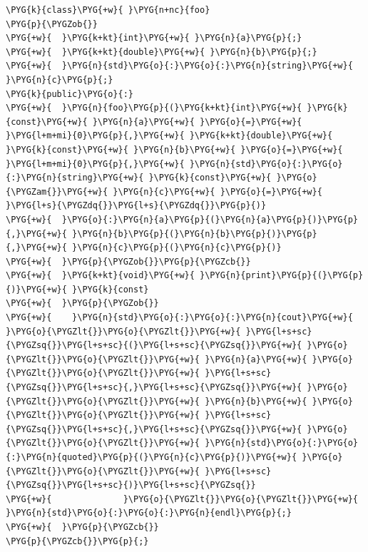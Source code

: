 \begin{codeblockbg}
\begin{Verbatim}[commandchars=\\\{\},breaklines=true,breakanywhere=true,fontsize=\codefont,xleftmargin=17bp]
\PYG{k}{class}\PYG{+w}{ }\PYG{n+nc}{foo}
\PYG{p}{\PYGZob{}}
\PYG{+w}{  }\PYG{k+kt}{int}\PYG{+w}{ }\PYG{n}{a}\PYG{p}{;}
\PYG{+w}{  }\PYG{k+kt}{double}\PYG{+w}{ }\PYG{n}{b}\PYG{p}{;}
\PYG{+w}{  }\PYG{n}{std}\PYG{o}{:}\PYG{o}{:}\PYG{n}{string}\PYG{+w}{ }\PYG{n}{c}\PYG{p}{;}
\PYG{k}{public}\PYG{o}{:}
\PYG{+w}{  }\PYG{n}{foo}\PYG{p}{(}\PYG{k+kt}{int}\PYG{+w}{ }\PYG{k}{const}\PYG{+w}{ }\PYG{n}{a}\PYG{+w}{ }\PYG{o}{=}\PYG{+w}{ }\PYG{l+m+mi}{0}\PYG{p}{,}\PYG{+w}{ }\PYG{k+kt}{double}\PYG{+w}{ }\PYG{k}{const}\PYG{+w}{ }\PYG{n}{b}\PYG{+w}{ }\PYG{o}{=}\PYG{+w}{ }\PYG{l+m+mi}{0}\PYG{p}{,}\PYG{+w}{ }\PYG{n}{std}\PYG{o}{:}\PYG{o}{:}\PYG{n}{string}\PYG{+w}{ }\PYG{k}{const}\PYG{+w}{ }\PYG{o}{\PYGZam{}}\PYG{+w}{ }\PYG{n}{c}\PYG{+w}{ }\PYG{o}{=}\PYG{+w}{ }\PYG{l+s}{\PYGZdq{}}\PYG{l+s}{\PYGZdq{}}\PYG{p}{)}
\PYG{+w}{  }\PYG{o}{:}\PYG{n}{a}\PYG{p}{(}\PYG{n}{a}\PYG{p}{)}\PYG{p}{,}\PYG{+w}{ }\PYG{n}{b}\PYG{p}{(}\PYG{n}{b}\PYG{p}{)}\PYG{p}{,}\PYG{+w}{ }\PYG{n}{c}\PYG{p}{(}\PYG{n}{c}\PYG{p}{)}
\PYG{+w}{  }\PYG{p}{\PYGZob{}}\PYG{p}{\PYGZcb{}}
\PYG{+w}{  }\PYG{k+kt}{void}\PYG{+w}{ }\PYG{n}{print}\PYG{p}{(}\PYG{p}{)}\PYG{+w}{ }\PYG{k}{const}
\PYG{+w}{  }\PYG{p}{\PYGZob{}}
\PYG{+w}{    }\PYG{n}{std}\PYG{o}{:}\PYG{o}{:}\PYG{n}{cout}\PYG{+w}{ }\PYG{o}{\PYGZlt{}}\PYG{o}{\PYGZlt{}}\PYG{+w}{ }\PYG{l+s+sc}{\PYGZsq{}}\PYG{l+s+sc}{(}\PYG{l+s+sc}{\PYGZsq{}}\PYG{+w}{ }\PYG{o}{\PYGZlt{}}\PYG{o}{\PYGZlt{}}\PYG{+w}{ }\PYG{n}{a}\PYG{+w}{ }\PYG{o}{\PYGZlt{}}\PYG{o}{\PYGZlt{}}\PYG{+w}{ }\PYG{l+s+sc}{\PYGZsq{}}\PYG{l+s+sc}{,}\PYG{l+s+sc}{\PYGZsq{}}\PYG{+w}{ }\PYG{o}{\PYGZlt{}}\PYG{o}{\PYGZlt{}}\PYG{+w}{ }\PYG{n}{b}\PYG{+w}{ }\PYG{o}{\PYGZlt{}}\PYG{o}{\PYGZlt{}}\PYG{+w}{ }\PYG{l+s+sc}{\PYGZsq{}}\PYG{l+s+sc}{,}\PYG{l+s+sc}{\PYGZsq{}}\PYG{+w}{ }\PYG{o}{\PYGZlt{}}\PYG{o}{\PYGZlt{}}\PYG{+w}{ }\PYG{n}{std}\PYG{o}{:}\PYG{o}{:}\PYG{n}{quoted}\PYG{p}{(}\PYG{n}{c}\PYG{p}{)}\PYG{+w}{ }\PYG{o}{\PYGZlt{}}\PYG{o}{\PYGZlt{}}\PYG{+w}{ }\PYG{l+s+sc}{\PYGZsq{}}\PYG{l+s+sc}{)}\PYG{l+s+sc}{\PYGZsq{}}
\PYG{+w}{              }\PYG{o}{\PYGZlt{}}\PYG{o}{\PYGZlt{}}\PYG{+w}{ }\PYG{n}{std}\PYG{o}{:}\PYG{o}{:}\PYG{n}{endl}\PYG{p}{;}
\PYG{+w}{  }\PYG{p}{\PYGZcb{}}
\PYG{p}{\PYGZcb{}}\PYG{p}{;}
\end{Verbatim}
\end{codeblockbg}



